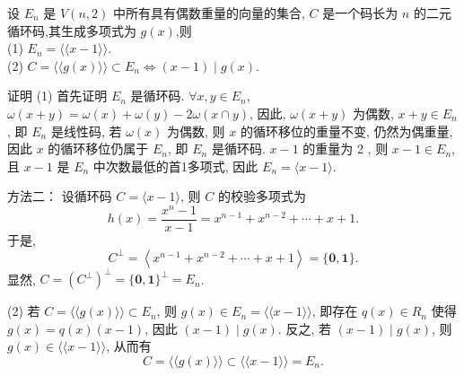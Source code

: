 \begin{exercise}
 设 $ E_{n} $ 是 $ V(n, 2) $ 中所有具有偶数重量的向量的集合, $ C $ 是一个码长为 $ n $ 的二元循环码,其生成多项式为 $ g(x) $,则\\
(1) $ E_{n}=\langle \langle x-1\rangle \rangle$.\\
(2) $ C=\langle\langle g(x)\rangle\rangle \subset E_{n} \Longleftrightarrow(x-1) \mid g(x) $.
\end{exercise}
\begin{solution}
    证明 (1) 首先证明 $ E_{n} $ 是循环码. $ \forall x, y \in E_{n} $, $ \omega(x+y)=\omega(x)+\omega(y)-2 \omega(x \cap y) $, 因此, $ \omega(x+y) $ 为偶数, $ x+y \in E_{n} $, 即 $ E_{n} $ 是线性码, 若 $ \omega(x) $ 为偶数, 则 $ x $ 的循环移位的重量不变, 仍然为偶重量, 因此 $ x $ 的循环移位仍属于 $ E_{n} $, 即 $ E_{n} $ 是循环码. $ x-1 $ 的重量为 2 , 则 $ x-1 \in E_{n} $, 且 $ x-1 $ 是 $ E_{n} $ 中次数最低的首1多项式, 因此 $ E_{n}=\langle x-1\rangle $.

方法二： 设循环码 $ C=\langle x-1\rangle $, 则 $ C $ 的校验多项式为
$$
h(x)=\frac{x^{n}-1}{x-1}=x^{n-1}+x^{n-2}+\cdots+x+1 .
$$
于是,
$$
C^{\perp}=\left\langle x^{n-1}+x^{n-2}+\cdots+x+1\right\rangle=\{\mathbf{0}, \mathbf{1}\} .
$$
显然, $ C=\left(C^{\perp}\right)^{\perp}=\{\mathbf{0}, \mathbf{1}\}^{\perp}=E_{n} $.
    
(2) 若 $ C=\langle\langle g(x)\rangle\rangle \subset E_{n} $, 则 $ g(x) \in E_{n}=\langle\langle x-1\rangle\rangle $, 即存在 $ q(x) \in R_{n} $ 使得 $ g(x)=q(x)(x-1) $, 因此 $ (x-1) \mid g(x) $. 反之, 若 $ (x-1) \mid g(x) $, 则 $ g(x) \in\langle\langle x-1\rangle \rangle$, 从而有
$$
C=\langle\langle g(x)\rangle\rangle \subset\langle\langle x-1\rangle\rangle=E_{n} .
$$
\end{solution}




